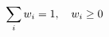 \documentclass[preview]{standalone}
\begin{document}
\begin{align*}
\special{dvisvgm:raw <g id='unique000'>}\sum_i w_i = 1, \quad w_i \geq 0\special{dvisvgm:raw </g>}
\end{align*}
\end{document}
